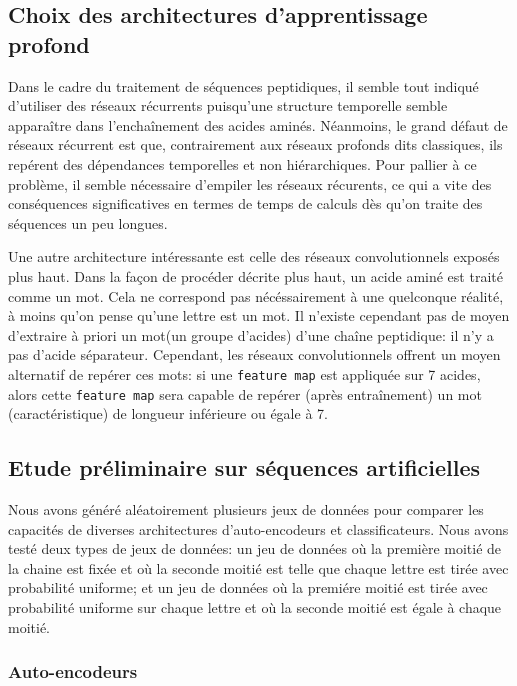 \documentclass[a4paper,11pt]{article}
\begin{document}
\subsection{Choix des architectures d'apprentissage profond}

Dans le cadre du traitement de séquences peptidiques, il semble tout indiqué
d'utiliser des réseaux récurrents puisqu'une structure temporelle semble
apparaître dans l'enchaînement des acides aminés. Néanmoins, le grand défaut de
réseaux récurrent est que, contrairement aux réseaux profonds dits \og
classiques\fg, ils repérent des dépendances temporelles et non hiérarchiques.
Pour pallier à ce problème, il semble nécessaire d'empiler les réseaux
récurents, ce qui a vite des conséquences significatives en termes de temps de
calculs dès qu'on traite des séquences un peu longues.

Une autre architecture intéressante est celle des réseaux convolutionnels
exposés plus haut. Dans la façon de procéder décrite plus haut, un acide aminé
est traité comme un \og mot\fg. Cela ne correspond pas nécéssairement à une
quelconque réalité, à moins qu'on pense qu'une lettre est un mot. Il n'existe
cependant pas de moyen d'extraire à priori un \og mot\fg (un groupe d'acides)
d'une chaîne peptidique: il n'y a pas d'acide \og séparateur\fg. Cependant, les
réseaux convolutionnels offrent un moyen alternatif de repérer ces mots: si une
\texttt{feature map} est appliquée sur 7 acides, alors cette \texttt{feature
  map} sera capable de repérer (après entraînement) un mot (caractéristique) de
longueur inférieure ou égale à 7.

\subsection{Etude préliminaire sur séquences artificielles}

Nous avons généré aléatoirement plusieurs jeux de données pour comparer les
capacités de diverses architectures d'auto-encodeurs et classificateurs. Nous
avons testé deux types de jeux de données: un jeu de données où la première
moitié de la chaine est fixée et où la seconde moitié est telle que chaque
lettre est tirée avec probabilité uniforme; et un jeu de données où la premiére
moitié est tirée avec probabilité uniforme sur chaque lettre et où la seconde
moitié est égale à chaque moitié.

\subsubsection{Auto-encodeurs}
\end{document}
